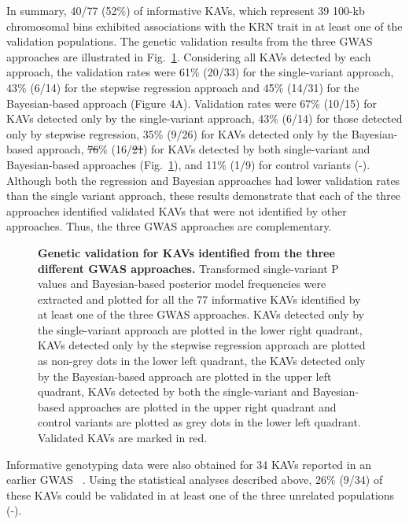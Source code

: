 \documentclass[10pt,letterpaper]{article}
\providecommand{\DIFaddtex}[1]{{\protect\color{blue}\uwave{#1}}} %
\providecommand{\DIFdeltex}[1]{{\protect\color{red}\sout{#1}}}                      %
\providecommand{\DIFaddbegin}{} %
\providecommand{\DIFaddend}{} %
\providecommand{\DIFdelbegin}{} %
\providecommand{\DIFdelend}{} %
\providecommand{\DIFadd}[1]{\texorpdfstring{\DIFaddtex{#1}}{#1}} %
\providecommand{\DIFdel}[1]{\texorpdfstring{\DIFdeltex{#1}}{}} %
\begin{document}
In summary, 40/77 (52\%) of informative KAVs, which represent 39 100-kb chromosomal bins exhibited associations with the KRN trait in at least one of the validation populations. The genetic validation results from the three GWAS approaches are illustrated in Fig.~\ref{fig4}. Considering all KAVs detected by each approach, the validation rates were 61\% (20/33) for the single-variant approach, 43\% (6/14) for the stepwise regression approach and 45\% (14/31) for the Bayesian-based approach (Figure 4A). Validation rates were 67\% (10/15) for KAVs detected only by the single-variant approach, 43\% (6/14) for those detected only by stepwise regression, 35\% (9/26) for KAVs detected only by the Bayesian-based approach, \DIFdelbegin \DIFdel{76}\DIFdelend \DIFaddbegin \DIFadd{73}\DIFaddend \% (16/\DIFdelbegin \DIFdel{21}\DIFdelend \DIFaddbegin \DIFadd{22}\DIFaddend ) for KAVs detected by both single-variant and Bayesian-based approaches (Fig.~\ref{fig4}), and 11\% (1/9) for control variants (-). Although both the regression and Bayesian approaches had lower validation rates than the single variant approach, these results demonstrate that each of the three approaches identified validated KAVs that were not identified by other approaches. Thus, the three GWAS approaches are complementary. 

\begin{figure}[h]
\caption{{\bf Genetic validation for KAVs identified from the three different GWAS approaches.}
Transformed single-variant P values and Bayesian-based posterior model frequencies were extracted and plotted for all the 77 informative KAVs identified by at least one of the three GWAS approaches. KAVs detected only by the single-variant approach are plotted in the lower right quadrant, KAVs detected only by the stepwise regression approach are plotted as non-grey dots in the lower left quadrant, the KAVs detected only by the Bayesian-based approach are plotted in the upper left quadrant, KAVs detected by both the single-variant and Bayesian-based approaches are plotted in the upper right quadrant and control variants are plotted as grey dots in the lower left quadrant. Validated KAVs are marked in red.}
\label{fig4}
\end{figure}

Informative genotyping data were also obtained for 34 KAVs reported in an earlier GWAS ~\cite{Brown2011}. Using the statistical analyses described above, 26\% (9/34) of these KAVs could be validated in at least one of the three unrelated populations (-).
\end{document}
